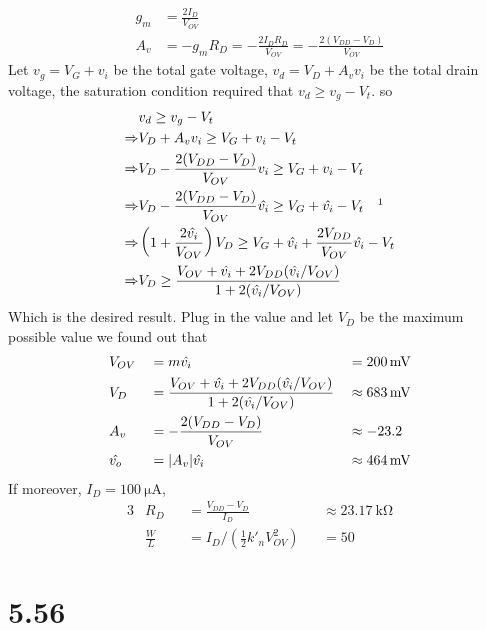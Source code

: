 \documentclass[12pt, a4paper]{article}
\begin{document}
\Ans\\
\begin{align*}
  g_m &= \frac{2I_D}{V_{OV}}\\
  A_v &= -g_m R_D = -\frac{2 I_D R_D}{V_{OV}}  = -\frac{2 (V_{DD} - V_D)}{V_{OV}} 
\end{align*}
Let $v_g = V_G + v_i$ be the total gate voltage, $v_d = V_D + A_v v_i$ be the total drain voltage, the saturation condition required that $v_d \geq v_g - V_t$. so
\begin{align*}
  & v_d \geq v_g - V_t \\
  \Rightarrow & V_D + A_v v_i \geq V_G + v_i - V_t  \\
  \Rightarrow & V_D - \frac{2 (V_{DD} - V_D)}{V_{OV}} v_i \geq V_G + v_i - V_t \\
  \Rightarrow  & V_D - \frac{2 (V_{DD} - V_D)}{V_{OV}} \hat{v_i} \geq V_G + \hat{v_i} - V_t \quad \footnotemark \\
  \Rightarrow & \left(1 + \frac{2\hat{v_i}}{V_{OV}}\right) V_D \geq V_G + \hat{v_i} + \frac{2V_{DD}}{V_{OV}} \hat{v_i}  - V_t  \\
  \Rightarrow & V_D \geq \frac{V_{OV} + \hat{v_i} + 2 V_{DD} (\hat{v_i} / V_{OV}) }{1 + 2(\hat{v_i}/V_{OV})} 
\end{align*}
Which is the desired result.
Plug in the value and let $V_D$ be the maximum possible value we found out that
\begin{alignat*}{3}
  & V_{OV} &&= m \hat{v_i} && = \SI{200}{\mV} \\
  & V_{D} &&= \frac{V_{OV} + \hat{v_i} + 2 V_{DD} (\hat{v_i} / V_{OV}) }{1 + 2(\hat{v_i}/V_{OV})} && \approx \SI{683}{\mV} \\
  & A_v &&= -\frac{2(V_{DD} - V_D)}{V_{OV}}  && \approx -23.2 \\
  & \hat{v_o} &&= \abs{A_v} \hat{v_i} && \approx \SI{464}\mV \\
\end{alignat*}
If moreover, $I_D = \SI{100}{\uA}$,
\begin{alignat*}{3}
  & R_D &&= \frac{V_{DD} - V_D}{I_D}  && \approx \SI{23.17}{\kohm} \\
  & \frac{W}{L} &&= I_D / \left(\frac{1}{2} k'_n V_{OV}^2 \right) && = 50
\end{alignat*}

\section{5.56}
\end{document}
